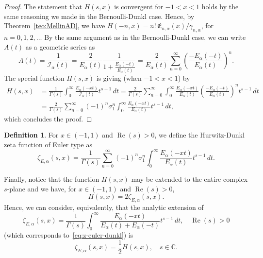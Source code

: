 \documentclass[a4paper]{amsart}
\newcommand{\C}{\mathbb{C}}
\newcommand{\I}{\mathcal{I}}
\newcommand{\Ea}{E_{\alpha}}
\newcommand{\E}{\mathfrak{E}}
\renewcommand{\Re}{\operatorname{Re}}
\theoremstyle{plain}
\theoremstyle{definition}
\newtheorem{definition}[theorem]{Definition}
\theoremstyle{remark}
\numberwithin{equation}{section}
\begin{document}
\begin{proof}
The statement that $H(s,x)$ is convergent for $-1<x<1$ holds by the same reasoning we made in the Bernoulli-Dunkl case. Hence, by Theorem~\ref{teo:MellinAD}, we have $H(-n,x) = n!\,\E_{n,\alpha}(x)/\gamma_{n,\alpha}$, for $n=0,1,2,\dots$
By the same argument as in the Bernoulli-Dunkl case, we can write $A(t)$ as a geometric series as 
\[
A(t) = \frac{1}{\I_{\alpha}(t)} 
= \frac{2}{\Ea(t)}
\frac{1}{1 + \frac{\Ea(-t)}{\Ea(t)}} 
=  \frac{2}{\Ea(t)} \sum_{n=0}^{\infty} \left(\frac{-\Ea(-t)}{\Ea(t)}\right)^n.
\]
The special function $H(s,x)$ is giving (when $-1<x<1$) by
\begin{align*}
H(s,x) & = \frac{1}{\Gamma(s)} \int_{0}^{\infty} \frac{\Ea(-xt)}{\I_{\alpha}(t)} t^{s-1} \,dt 
= \frac{2}{\Gamma(s)} \sum_{n=0}^{\infty}
\int_{0}^{\infty} \frac{\Ea(-xt)}{\Ea(t)} \left(\frac{-\Ea(-t)}{\Ea(t)}\right)^n t^{s-1} \,dt \\
& = \frac{2}{\Gamma(s)} \sum_{n=0}^{\infty}(-1)^n \sigma_1^n 
\int_{0}^{\infty} \frac{\Ea(-xt)}{\Ea(t)} t^{s-1} \,dt,
\end{align*}
which concludes the proof.
\end{proof}

\begin{definition}
\label{def:HD-zeta-euler}
For $x \in (-1, 1)$ and $\Re(s) > 0$, we define the Hurwitz-Dunkl zeta function of Euler type as
\begin{equation}
\label{eq:z-euler-dunkl}
\zeta_{E,\alpha}(s,x) = \frac{1}{\Gamma(s)} \sum_{n=0}^{\infty}
(-1)^n \sigma_1^n  \int_{0}^{\infty} \frac{\Ea(-xt)}{\Ea(t)} t^{s-1} \,dt.
\end{equation}
\end{definition}

Finally, notice that the function $H(s,x)$ may be extended to the entire complex $s$-plane and we have, for $x \in (-1, 1)$ and $\Re(s)>0$,
\begin{equation*}
H(s,x) = 2\zeta_{E,\alpha}(s,x).
\end{equation*}
Hence, we can consider, equivalently, that the analytic extension of
\begin{equation}
\label{eq:HD-zetaHE0}
  \zeta_{E,\alpha}(s,x) 
  =  \frac{1}{\Gamma(s)}
\int_{0}^{\infty} \frac{\Ea(-xt)}{\Ea(t)+\Ea(-t)} t^{s-1}\,dt,
\quad \Re(s) >0
\end{equation}
(which corresponds to~\eqref{eq:z-euler-dunkl}) is
\begin{equation}
\label{eq:HDE-zeta}
  \zeta_{E,\alpha}(s,x) = \frac{1}{2} H(s,x), 
  \quad s \in \C.
\end{equation}
\end{document}
